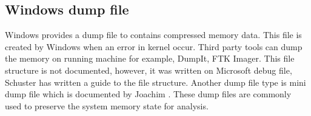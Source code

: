 \subsection[Windows dump file]{Windows dump file}

Windows provides a dump file to contains compressed memory data. This file is created by Windows when an error in kernel occur. Third party tools can dump the memory on running machine for example, DumpIt, FTK Imager. This file structure is not documented, however, it was written on Microsoft debug file, Schuster \cite{dmpfile} has written a guide to the file structure. Another dump file type is mini dump file which is documented by Joachim \cite{mdmpfile}. These dump files are commonly used to preserve the system memory state for analysis.
